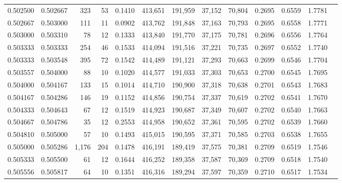 \begin{tabular}{rrrrrrrrrrrrr}
0.502500 & 0.502667 &   323 &  53 &                                     0.1410 & 413,651 & 191,959 &  37,152 &  70,804 & 0.2695 & 0.6559 & 1.7781 \\
0.502667 & 0.503000 &   111 &  11 &                                     0.0902 & 413,762 & 191,848 &  37,163 &  70,793 & 0.2695 & 0.6558 & 1.7771 \\
0.503000 & 0.503310 &    78 &  12 &                                     0.1333 & 413,840 & 191,770 &  37,175 &  70,781 & 0.2696 & 0.6556 & 1.7764 \\
0.503333 & 0.503333 &   254 &  46 &                                     0.1533 & 414,094 & 191,516 &  37,221 &  70,735 & 0.2697 & 0.6552 & 1.7740 \\
0.503333 & 0.503548 &   395 &  72 &                                     0.1542 & 414,489 & 191,121 &  37,293 &  70,663 & 0.2699 & 0.6546 & 1.7704 \\
0.503557 & 0.504000 &    88 &  10 &                                     0.1020 & 414,577 & 191,033 &  37,303 &  70,653 & 0.2700 & 0.6545 & 1.7695 \\
0.504000 & 0.504167 &   133 &  15 &                                     0.1014 & 414,710 & 190,900 &  37,318 &  70,638 & 0.2701 & 0.6543 & 1.7683 \\
0.504167 & 0.504286 &   146 &  19 &                                     0.1152 & 414,856 & 190,754 &  37,337 &  70,619 & 0.2702 & 0.6541 & 1.7670 \\
0.504333 & 0.504643 &    67 &  12 &                                     0.1519 & 414,923 & 190,687 &  37,349 &  70,607 & 0.2702 & 0.6540 & 1.7663 \\
0.504667 & 0.504786 &    35 &  12 &                                     0.2553 & 414,958 & 190,652 &  37,361 &  70,595 & 0.2702 & 0.6539 & 1.7660 \\
0.504810 & 0.505000 &    57 &  10 &                                     0.1493 & 415,015 & 190,595 &  37,371 &  70,585 & 0.2703 & 0.6538 & 1.7655 \\
0.505000 & 0.505286 & 1,176 & 204 &                                     0.1478 & 416,191 & 189,419 &  37,575 &  70,381 & 0.2709 & 0.6519 & 1.7546 \\
0.505333 & 0.505500 &    61 &  12 &                                     0.1644 & 416,252 & 189,358 &  37,587 &  70,369 & 0.2709 & 0.6518 & 1.7540 \\
0.505556 & 0.505817 &    64 &  10 &                                     0.1351 & 416,316 & 189,294 &  37,597 &  70,359 & 0.2710 & 0.6517 & 1.7534 \\

\end{tabular}
